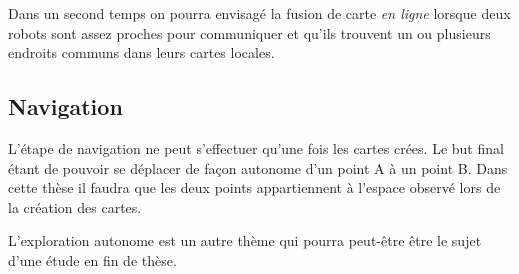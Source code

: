 Dans un second temps on pourra envisagé la fusion de carte \emph{en ligne} lorsque deux robots sont assez proches pour communiquer et qu'ils trouvent un ou plusieurs endroits communs dans leurs cartes locales.

\subsection{Navigation}

L'étape de navigation ne peut s'effectuer qu'une fois les cartes crées.
Le but final étant de pouvoir se déplacer de façon autonome d'un point A à un point B.
Dans cette thèse il faudra que les deux points appartiennent à l'espace observé lors de la création des cartes.

L'exploration autonome est un autre thème qui pourra peut-être être le sujet d'une étude en fin de thèse.



